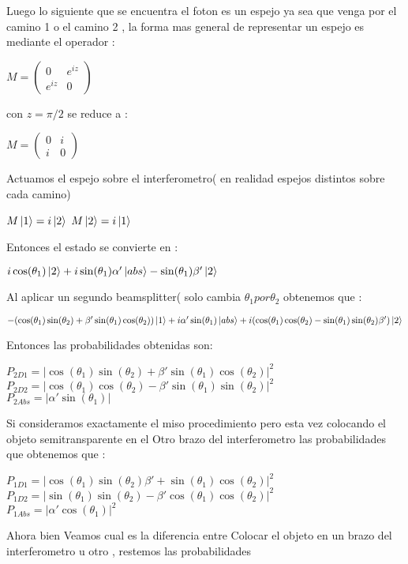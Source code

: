 \documentclass[11pt]{article}
\begin{document}
Luego lo siguiente que se encuentra el foton es un espejo ya sea que venga por el camino 1 o el camino 2 , la forma mas general de representar un espejo es mediante el operador :

$M=\begin{pmatrix} 0& e^{i z} \\ e^{iz} & 0 \end{pmatrix}$

con $z=\pi/2$ se reduce a :

$M=\begin{pmatrix} 0& i\\ i & 0 \end{pmatrix}$

Actuamos el espejo sobre el interferometro( en realidad espejos distintos sobre cada camino)

$M \ket{1}=i\ket{2}$   \hspace{3cm}   $M\ket{2}=i\ket{1}$

Entonces el estado se convierte en :

$i\cos(\theta_{1})\ket{2}+i \sin(\theta_{1})\alpha'\ket{abs}-\sin(\theta_{1})\beta'\ket{2}$

Al aplicar un segundo beamsplitter( solo cambia $\theta_{1} por \theta_{2} $ obtenemos que :

$-(\cos(\theta_{1})\sin(\theta_{2})+\beta' \sin(\theta_{1})\cos(\theta_{2}))\ket{1}+i \alpha' \sin(\theta_{1})\ket{abs}+i(\cos(\theta_{1})\cos(\theta_{2})-\sin(\theta_{1})\sin(\theta_{2})\beta')\ket{2}$


Entonces las probabilidades obtenidas son:

$P_{2D1}=|\cos(\theta_{1})\sin(\theta_{2})+\beta' \sin(\theta_{1})\cos(\theta_{2})|^2$\\
$P_{2D2}=|\cos(\theta_{1})\cos(\theta_{2})-\beta' \sin(\theta_{1})\sin(\theta_{2})|^2$\\
$P_{2Abs}=|\alpha' \sin(\theta_{1})|$

Si consideramos exactamente el miso procedimiento pero esta vez colocando el objeto semitransparente en el Otro brazo del interferometro las probabilidades que obtenemos que :

$P_{1D1}=|\cos(\theta_{1})\sin(\theta_{2})\beta' +\sin(\theta_{1})\cos(\theta_{2})|^2$\\
$P_{1D2}=|\sin(\theta_{1})\sin(\theta_{2})-\beta' \cos(\theta_{1})\cos(\theta_{2})|^2$\\
$P_{1Abs}=|\alpha' \cos(\theta_{1})|^2$

Ahora bien Veamos cual es la diferencia entre Colocar el objeto en un brazo del interferometro u otro , restemos las probabilidades
\end{document}
